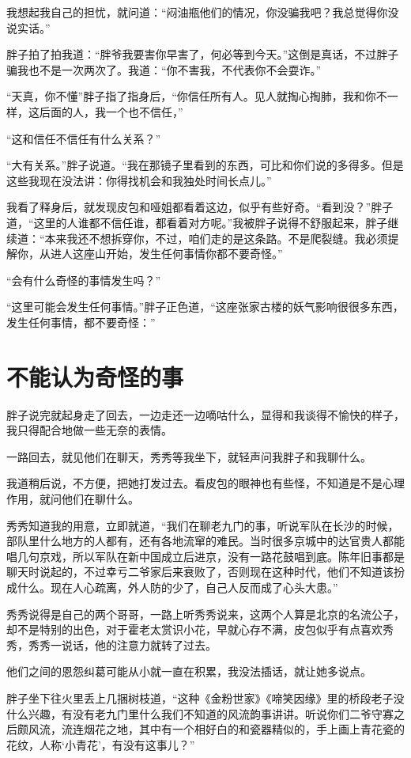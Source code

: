 我想起我自己的担忧，就问道：“闷油瓶他们的情况，你没骗我吧？我总觉得你没说实话。”

胖子拍了拍我道：“胖爷我要害你早害了，何必等到今天。”这倒是真话，不过胖子骗我也不是一次两次了。我道：“你不害我，不代表你不会耍诈。”

“天真，你不懂”胖子指了指身后，“你信任所有人。见人就掏心掏肺，我和你不一样，这后面的人，我一个也不信任，”

“这和信任不信任有什么关系？”

“大有关系。”胖子说道。“我在那镜子里看到的东西，可比和你们说的多得多。但是这些我现在没法讲：你得找机会和我独处时间长点儿。”

我看了释身后，就发现皮包和哑姐都看着这边，似乎有些好奇。“看到没？”胖子道，“这里的人谁都不信任谁，都看着对方呢。”我被胖子说得不舒服起来，胖子继续道：“本来我还不想拆穿你，不过，咱们走的是这条路。不是爬裂缝。我必须提解你，从进人这座山开始，发生任何事情你都不要奇怪。”

“会有什么奇怪的事情发生吗？”

“这里可能会发生任何事情。”胖子正色道，“这座张家古楼的妖气影响很很多东西，发生任何事情，都不要奇怪：”

\chapter{不能认为奇怪的事}

胖子说完就起身走了回去，一边走还一边嘀咕什么，显得和我谈得不愉快的样子，我只得配合地做一些无奈的表情。

一路回去，就见他们在聊天，秀秀等我坐下，就轻声问我胖子和我聊什么。

我道稍后说，不方便，把她打发过去。看皮包的眼神也有些怪，不知道是不是心理作用，就问他们在聊什么。

秀秀知道我的用意，立即就道，“我们在聊老九门的事，听说军队在长沙的时候，部队里什么地方的人都有，还有各地流窜的难民。当时很多京城中的达官贵人都能唱几句京戏，所以军队在新中国成立后进京，没有一路花鼓唱到底。陈年旧事都是聊天时说起的，不过幸亏二爷家后来衰败了，否则现在这种时代，他们不知道该扮成什么。现在人心疏离，外人防的少了，自己人反而成了心头大患。”

秀秀说得是自己的两个哥哥，一路上听秀秀说来，这两个人算是北京的名流公子，却不是特别的出色，对于霍老太赏识小花，早就心存不满，皮包似乎有点喜欢秀秀，秀秀一说话，他的注意力就转了过去。

他们之间的恩怨纠葛可能从小就一直在积累，我没法插话，就让她多说点。

胖子坐下往火里丢上几捆树枝道，“这种《金粉世家》《啼笑因缘》里的桥段老子没什么兴趣，有没有老九门里什么我们不知道的风流韵事讲讲。听说你们二爷守寡之后颇风流，流连烟花之地，其中有一个相好白的和瓷器精似的，手上画上青花瓷的花纹，人称‘小青花’，有没有这事儿？”

